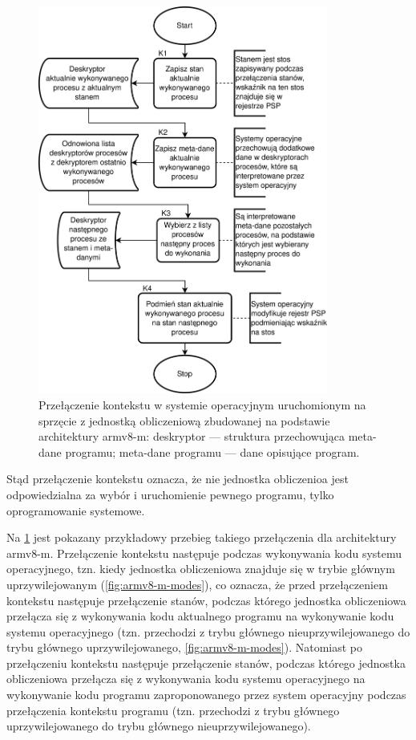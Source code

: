 \documentclass[../main]{subfiles}
\begin{document}
\begin{figure}[h]
    \centering
    \includegraphics[width=0.85\textwidth]{Images/context-switching-armv8-m.png}
    \caption{Przełączenie kontekstu w systemie operacyjnym uruchomionym na sprzęcie z jednostką
    obliczeniową zbudowanej na podstawie architektury \acrshort{arm}v8-\acrshort{m}: deskryptor —
    struktura przechowująca meta-dane programu; meta-dane programu — dane opisujące program.}
    \label{fig:armv8-m-context-switch}
\end{figure}

Stąd przełączenie kontekstu oznacza, że nie jednostka obliczenioa jest odpowiedzialna za wybór i
uruchomienie pewnego programu, tylko oprogramowanie systemowe.

Na \cref{fig:armv8-m-context-switch} jest pokazany przykładowy przebieg takiego przełączenia dla
architektury \acrshort{arm}v8-\acrshort{m}. Przełączenie kontekstu następuje podczas wykonywania kodu
systemu operacyjnego, tzn. kiedy jednostka obliczeniowa znajduje się w trybie głównym uprzywilejowanym
(\cref{fig:armv8-m-modes}), co oznacza, że przed przełączeniem kontekstu następuje przełączenie
stanów, podczas którego jednostka obliczeniowa przełącza się z wykonywania kodu aktualnego programu na
wykonywanie kodu systemu operacyjnego (tzn. przechodzi z trybu głównego nieuprzywilejowanego do trybu
głównego uprzywilejowanego, \cref{fig:armv8-m-modes}). Natomiast po przełączeniu kontekstu następuje
przełączenie stanów, podczas którego jednostka obliczeniowa przełącza się z wykonywania kodu systemu
operacyjnego na wykonywanie kodu programu zaproponowanego przez system operacyjny podczas przełączenia
kontekstu programu (tzn. przechodzi z trybu głównego uprzywilejowanego do trybu głównego
nieuprzywilejowanego).
\end{document}
